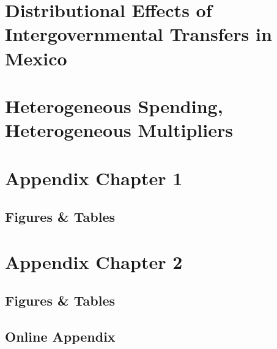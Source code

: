 \documentclass[12pt]{report}
\begin{document}

\label{sec:context}
\label{sec:identification}
\label{sec:data}
\label{sec:validity}
\label{sec:results}

\label{sec:channels}
\label{sec:channels}
\label{sec:channels}



\chapter{Distributional Effects of Intergovernmental Transfers in Mexico}\label{chap:c2}



\chapter{Heterogeneous Spending, Heterogeneous Multipliers}\label{chap:c3}





\appendixtocoff
\appendices

\chapter{Appendix Chapter 1}
\section{Figures \& Tables}
\label{FirstAppendixC1}
\label{SecondAppendixC1}

\chapter{Appendix Chapter 2}
\section{Figures \& Tables}
\label{FirstAppendixC2}
\label{SecondAppendixC2}
\section{Online Appendix}
\label{ThirdAppendixC2}
\end{document}
